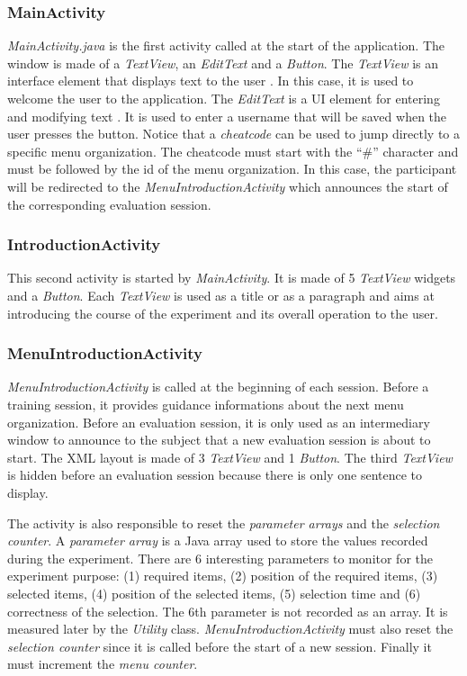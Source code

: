 \subsubsection{MainActivity}
\textit{MainActivity.java} is the first activity called at the start of the 
application. The window is made of a \textit{TextView}, an \textit{EditText} 
and a \textit{Button}. The \textit{TextView} is an interface element that 
displays text to the user \cite{android_textview}. In this case, it is 
used to welcome the user to the application. The \textit{EditText} is 
a UI element for entering and modifying text \cite{android_edittext}. It is 
used 
to enter a username that will be saved when the user presses the button. Notice 
that a \textit{cheatcode} can be used to jump directly to a specific menu 
organization. The cheatcode must start with the \enquote{\#} character and must 
be followed by the id of the menu organization. In this case, the participant 
will be redirected to the \textit{MenuIntroductionActivity} which announces the 
start of the corresponding evaluation session.

\subsubsection{IntroductionActivity}
This second activity is started by \textit{MainActivity}. It is made of 5 
\textit{TextView} widgets and a \textit{Button}. Each \textit{TextView} is used 
as a title or as a paragraph and aims at introducing the course of the 
experiment and its overall operation to the user.

\subsubsection{MenuIntroductionActivity}
\textit{MenuIntroductionActivity} is called at the beginning of each session. 
Before a training session, it provides guidance informations about the next 
menu organization. Before an evaluation session, it is only used as an 
intermediary window to announce to the subject that a new evaluation session 
is about to start. The XML layout is made of 3 \textit{TextView} and 1 
\textit{Button}. The third \textit{TextView} is hidden before an evaluation 
session because there is only one sentence to display.\newline

The activity is also responsible to reset the \textit{parameter arrays} and 
the \textit{selection counter}. A \textit{parameter array} is a Java array used 
to store the values recorded during the experiment. There are 6 interesting 
parameters to monitor for the experiment purpose: (1) required items, (2) 
position of the required items, (3) selected items, (4) position of the 
selected 
items, (5) selection time and (6) correctness of the selection. The 6th 
parameter is not recorded as an array. It is measured later by the 
\textit{Utility} class. \textit{MenuIntroductionActivity} must also reset the 
\textit{selection counter} since it is called before the start of a new 
session. 
Finally it must increment the \textit{menu counter}.

